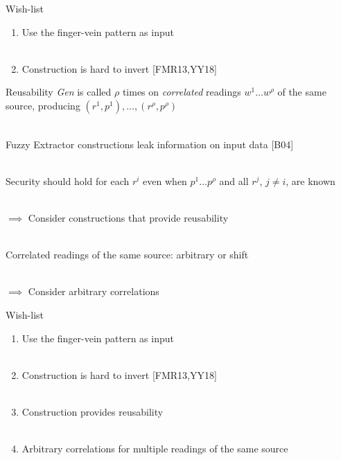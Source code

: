 \documentclass{beamer}
\def\fe{Fuzzy Extractor\xspace}
\newcommand{\gen}{\textit{Gen}\xspace}
\begin{document}
\begin{frame}{Wish-list}
    \begin{enumerate}
        \item Use the finger-vein pattern as input\\~
        \item Construction is hard to invert [FMR13,YY18]
    \end{enumerate}
\end{frame}
\begin{frame}{Reusability}
\gen is called $\rho$ times on \textit{correlated} readings $w^1 \dots w^\rho$ of the same source, producing $(r^1,p^1),\dots, (r^\rho,p^\rho)$ \\~\pause

\fe constructions leak information on input data [B04]\\~\pause %

Security should hold for each $r^i$ even when $p^1 \dots p^\rho$ and all $r^j$, $j\neq i$, are known\\~\pause

$\implies$ Consider constructions that provide reusability\\~\pause

Correlated readings of the same source: arbitrary or shift\\~\pause


$\implies$ Consider arbitrary correlations
\end{frame}
\begin{frame}{Wish-list}
    \begin{enumerate}
        \item Use the finger-vein pattern as input\\~
        \item Construction is hard to invert [FMR13,YY18]\\~
        \item Construction provides reusability\\~
        \item Arbitrary correlations for multiple readings of the same source 
    \end{enumerate}
\end{frame}
\end{document}
